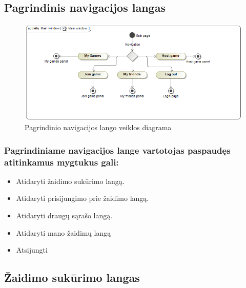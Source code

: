 \documentclass{VUMIFPSkursinis}
\begin{document}
	\subsection{Pagrindinis navigacijos langas}
		\begin{figure}[H]
			\centering
			\includegraphics[scale=0.5]{img/MainWindow_activity}
			\caption{Pagrindinio navigacijos lango veiklos diagrama}
			\label{img:MainWindow_activity}
		\end{figure}
		\subsubsection*{Pagrindiniame navigacijos lange vartotojas paspaudęs atitinkamus mygtukus gali:}
			\renewcommand{\labelitemi}{$\bullet$}
			\begin{itemize}
				\item Atidaryti žaidimo sukūrimo langą.
				\item Atidaryti prisijungimo prie žaidimo langą.
				\item Atidaryti draugų sąrašo langą.
				\item Atidaryti mano žaidimų langą
				\item Atsijungti
			\end{itemize}

	\subsection{Žaidimo sukūrimo langas}
\end{document}
